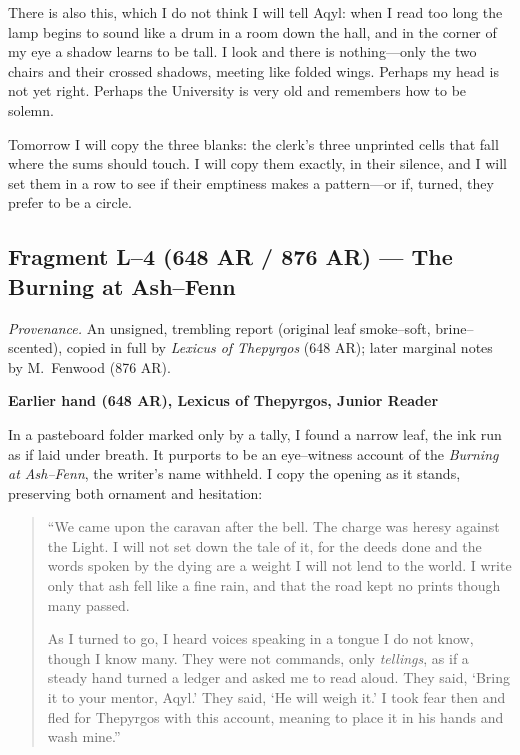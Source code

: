 \documentclass[11pt]{article}
\numberwithin{equation}{section} %
\theoremstyle{plain} %
\theoremstyle{definition} %
\theoremstyle{remark} %
\begin{document}
There is also this, which I do not think I will tell Aqyl: when I read too long the lamp begins to sound like a drum in a room down the hall, and in the corner of my eye a shadow learns to be tall. I look and there is nothing—only the two chairs and their crossed shadows, meeting like folded wings. Perhaps my head is not yet right. Perhaps the University is very old and remembers how to be solemn.

Tomorrow I will copy the three blanks: the clerk’s three unprinted cells that fall where the sums should touch. I will copy them exactly, in their silence, and I will set them in a row to see if their emptiness makes a pattern—or if, turned, they prefer to be a circle.

\subsection{Fragment L--4 (648 AR / 876 AR) — The Burning at Ash–Fenn}
\label{frag:l4}

\noindent\textit{Provenance.} An unsigned, trembling report (original leaf smoke–soft, brine–scented), copied in full by \textit{Lexicus of Thepyrgos} (648 AR); later marginal notes by M.\ Fenwood (876 AR).

\medskip
\noindent\textbf{Earlier hand (648 AR), Lexicus of Thepyrgos, Junior Reader}

In a pasteboard folder marked only by a tally, I found a narrow leaf, the ink run as if laid under breath. It purports to be an eye–witness account of the \textit{Burning at Ash–Fenn}, the writer’s name withheld. I copy the opening as it stands, preserving both ornament and hesitation:

\begin{quote}\small
“We came upon the caravan after the bell. The charge was heresy against the Light. I will not set down the tale of it, for the deeds done and the words spoken by the dying are a weight I will not lend to the world. I write only that ash fell like a fine rain, and that the road kept no prints though many passed.

As I turned to go, I heard voices speaking in a tongue I do not know, though I know many. They were not commands, only \emph{tellings}, as if a steady hand turned a ledger and asked me to read aloud. They said, ‘Bring it to your mentor, Aqyl.’ They said, ‘He will weigh it.’ I took fear then and fled for Thepyrgos with this account, meaning to place it in his hands and wash mine.”
\end{quote}
\end{document}
